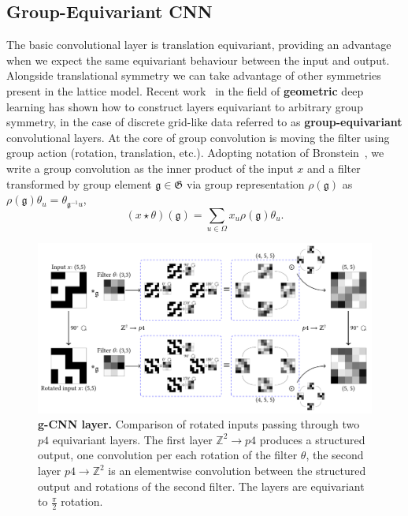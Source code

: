 \subsection{Group-Equivariant CNN}
The basic convolutional layer is translation equivariant, providing an advantage when we expect the same equivariant behaviour between the input and output. Alongside translational symmetry we can take advantage of other symmetries present in the lattice model. Recent work~\cite{bronstein2021geometric, cohen2016group} in the field of \textbf{geometric} deep learning has shown how to construct layers equivariant to arbitrary group symmetry, in the case of discrete grid-like data referred to as \textbf{group-equivariant} convolutional layers. At the core of {group convolution} is moving the filter using group action (rotation, translation, etc.). Adopting notation of Bronstein~\cite{bronstein2021geometric}, we write a group convolution as the inner product of the input $x$ and a filter transformed by group element $\mathfrak{g} \in \mathfrak{G}$ via group representation $\rho(\mathfrak{g})$ as $\rho(\mathfrak{g}) \theta_{u}=\theta_{\mathfrak{g}^{-1} u}$,
\begin{equation}
(x \star \theta)(\mathfrak{g})=\sum_{u \in \Omega} x_{u} \rho(\mathfrak{g}) \theta_{u}.
\end{equation}
\begin{figure}[h]
	\centering
	\includegraphics[width=\linewidth]{Chapter4/Figs/Vector/gcnn}
	\caption[Group-equivariant convolution]{\textbf{g-CNN layer.} Comparison of rotated inputs passing through two $p4$ equivariant layers. The first layer $\mathbb{Z}^2 \rightarrow p4$ produces a structured output, one convolution per each rotation of the filter $\theta$, the second layer $p4 \rightarrow \mathbb{Z}^2$ is an elementwise convolution between the structured output and rotations of the second filter. The layers are equivariant to $\frac{\pi}{2}$ rotation.}
	\label{fig:gcnn}
\end{figure}
